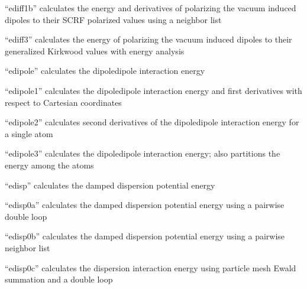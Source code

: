 \documentclass[letterpaper,11pt,english]{sphinxmanual}
\begin{document}
\sphinxAtStartPar
{}

\sphinxAtStartPar
“ediff1b” calculates the energy and derivatives of polarizing the vacuum induced dipoles to their SCRF polarized values using a neighbor list

\sphinxAtStartPar
{}

\sphinxAtStartPar
“ediff3” calculates the energy of polarizing the vacuum induced dipoles to their generalized Kirkwood values with energy analysis

\sphinxAtStartPar
{}

\sphinxAtStartPar
“edipole” calculates the dipole\sphinxhyphen{}dipole interaction energy

\sphinxAtStartPar
{}

\sphinxAtStartPar
“edipole1” calculates the dipole\sphinxhyphen{}dipole interaction energy and first derivatives with respect to Cartesian coordinates

\sphinxAtStartPar
{}

\sphinxAtStartPar
“edipole2” calculates second derivatives of the dipole\sphinxhyphen{}dipole interaction energy for a single atom

\sphinxAtStartPar
{}

\sphinxAtStartPar
“edipole3” calculates the dipole\sphinxhyphen{}dipole interaction energy; also partitions the energy among the atoms

\sphinxAtStartPar
{}

\sphinxAtStartPar
“edisp” calculates the damped dispersion potential energy

\sphinxAtStartPar
{}

\sphinxAtStartPar
“edisp0a” calculates the damped dispersion potential energy using a pairwise double loop

\sphinxAtStartPar
{}

\sphinxAtStartPar
“edisp0b” calculates the damped dispersion potential energy using a pairwise neighbor list

\sphinxAtStartPar
{}

\sphinxAtStartPar
“edisp0c” calculates the dispersion interaction energy using particle mesh Ewald summation and a double loop
\end{document}
